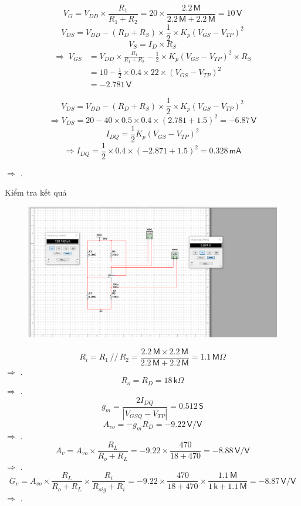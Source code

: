 \[
V_{G}=V_{DD}\times\frac{R_{1}}{R_{1}+R_{2}}=20\times\frac{2.2\,\textsf{M}}{2.2\,\textsf{M}+2.2\,\textsf{M}}=10\,\textsf{V}
\]
\[
V_{DS}=V_{DD}-\left(R_{D}+R_{S}\right)\times\frac{1}{2}\times K_{p}\left(V_{GS}-V_{TP}\right)^{2}
\]
\[
V_{S}=I_{D}\times R_{S}
\]
\[
\begin{aligned}
	\Rightarrow\; V_{GS} &= V_{DD}\times\frac{R_{1}}{R_{1}+R_{2}}
	- \frac{1}{2}\times K_{p}\left(V_{GS}-V_{TP}\right)^{2}\times R_{S} \\[6pt]
	&= 10 - \frac{1}{2}\times0.4\times22\times\left(V_{GS}-V_{TP}\right)^{2} \\[6pt]
	&= -2.781\,\textsf{V}
\end{aligned}
\]

\[
V_{DS}=V_{DD}-\left(R_{D}+R_{S}\right)\times\frac{1}{2}\times K_{p}\left(V_{GS}-V_{TP}\right)^{2}
\]
\[
\Rightarrow V_{DS}=20-40\times0.5\times0.4\times\left(2.781+1.5\right)^{2}=-6.87\,\textsf{V}
\]
\[
I_{DQ}=\frac{1}{2}K_{p}\left(V_{GS}-V_{TP}\right)^{2}
\]
\[
\Rightarrow I_{DQ}=\frac{1}{2}\times0.4\times\left(-2.871+1.5\right)^{2}=0.328\,\textsf{mA}
\]

$\Rightarrow$ .

Kiểm tra kết quả

\begin{figure}[H]
	\centering
	\includegraphics[width=\linewidth]{./my-chapters/my-images/Question1/Câu 1 Hình 2 a - Điểm Q.png}
\end{figure}


\[
R_{i}=R_{1}\,//\,R_{2}=\frac{2.2\,\textsf{M}\times2.2\,\textsf{M}}{2.2\,\textsf{M}+2.2\,\textsf{M}}=1.1\,\textsf{M}\Omega
\]
$\Rightarrow$ .
\[
R_{o}=R_{D}=18\,\textsf{k}\Omega
\]
$\Rightarrow$ .
\[
g_{m}=\frac{2I_{DQ}}{\left|V_{GSQ}-V_{TP}\right|}=0.512\,\textsf{S}
\]
\[
A_{vo}=-g_{m}R_{D}=-9.22\,\textsf{V/V}
\]
$\Rightarrow$ .
\[
A_{v}=A_{vo}\times\frac{R_{L}}{R_{o}+R_{L}}=-9.22\times\frac{470}{18+470}=-8.88\,\textsf{V/V}
\]
$\Rightarrow$ .
\[
G_{v}=A_{vo}\times\frac{R_{L}}{R_{o}+R_{L}}\times\frac{R_{i}}{R_{sig}+R_{i}}=-9.22\times\frac{470}{18+470}\times\frac{1.1\,\textsf{M}}{1\,\textsf{k}+1.1\,\textsf{M}}=-8.87\,\textsf{V/V}
\]
$\Rightarrow$ .


